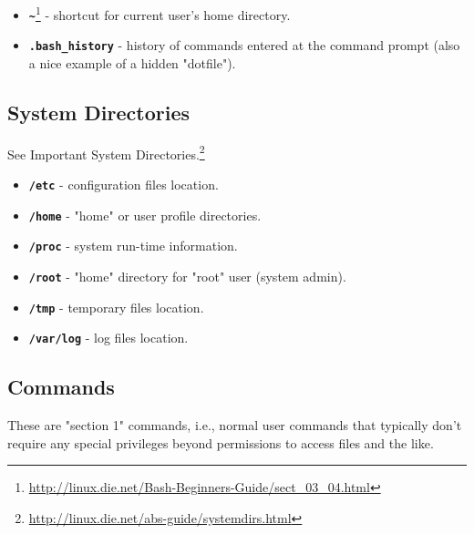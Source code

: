 \documentclass[10pt,]{book}
\renewcommand{\href}[2]{#2\footnote{\url{#1}}}
\numberwithin{figure}{chapter}
\begin{document}
\begin{itemize}
\item
  \href{http://linux.die.net/Bash-Beginners-Guide/sect_03_04.html}{\textbf{\texttt{\textasciitilde{}}}}
  - shortcut for current user's home directory.
\item
  \textbf{\texttt{.bash\_history}} - history of
  commands entered at the command prompt (also a nice example of a
  hidden "dotfile").
\end{itemize}

\subsection*{System Directories}\label{system-directories}

See \href{http://linux.die.net/abs-guide/systemdirs.html}{Important
System Directories.}

\begin{itemize}
\item
  \textbf{\texttt{/etc}} - configuration files location.
\item
  \textbf{\texttt{/home}} - "home" or user profile
  directories.
\item
  \textbf{\texttt{/proc}} - system run-time information.
\item
  \textbf{\texttt{/root}} - "home" directory for "root" user
  (system admin).
\item
  \textbf{\texttt{/tmp}} - temporary files location.
\item
  \textbf{\texttt{/var/log}} - log files location.
\end{itemize}

\subsection*{Commands}\label{commands}

These are "section 1" commands, i.e., normal user commands that
typically don't require any special privileges beyond permissions to
access files and the like.
\end{document}
